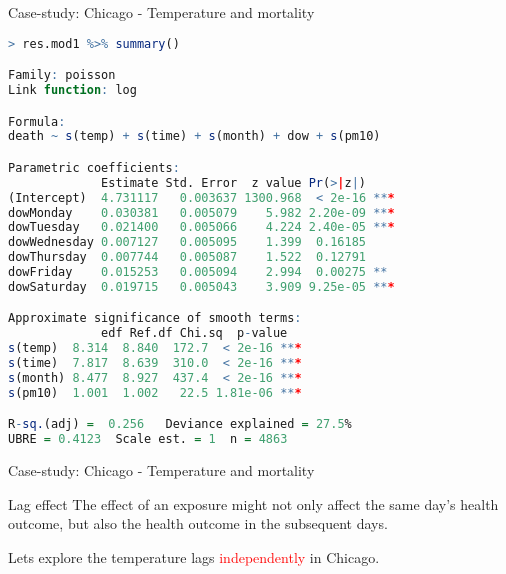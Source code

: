 \documentclass{beamer}
\begin{document}
\begin{frame}[fragile]{Case-study: Chicago - Temperature and mortality}
	\begin{lstlisting}[language=R, basicstyle=\tiny]
> res.mod1 %>% summary()

Family: poisson 
Link function: log 

Formula:
death ~ s(temp) + s(time) + s(month) + dow + s(pm10)

Parametric coefficients:
             Estimate Std. Error  z value Pr(>|z|)    
(Intercept)  4.731117   0.003637 1300.968  < 2e-16 ***
dowMonday    0.030381   0.005079    5.982 2.20e-09 ***
dowTuesday   0.021400   0.005066    4.224 2.40e-05 ***
dowWednesday 0.007127   0.005095    1.399  0.16185    
dowThursday  0.007744   0.005087    1.522  0.12791    
dowFriday    0.015253   0.005094    2.994  0.00275 ** 
dowSaturday  0.019715   0.005043    3.909 9.25e-05 ***

Approximate significance of smooth terms:
             edf Ref.df Chi.sq  p-value    
s(temp)  8.314  8.840  172.7  < 2e-16 ***
s(time)  7.817  8.639  310.0  < 2e-16 ***
s(month) 8.477  8.927  437.4  < 2e-16 ***
s(pm10)  1.001  1.002   22.5 1.81e-06 ***

R-sq.(adj) =  0.256   Deviance explained = 27.5%
UBRE = 0.4123  Scale est. = 1  n = 4863
	\end{lstlisting}
	
\end{frame}


\begin{frame}[fragile]{Case-study: Chicago - Temperature and mortality}
	
	\begin{block}{Lag effect}
	 The effect of an exposure might not only affect the same day's health outcome, but also the health outcome in the subsequent days.
	\end{block}

Lets explore the temperature lags \textcolor{red}{independently} in Chicago. 
	
	
\end{frame}
\end{document}
